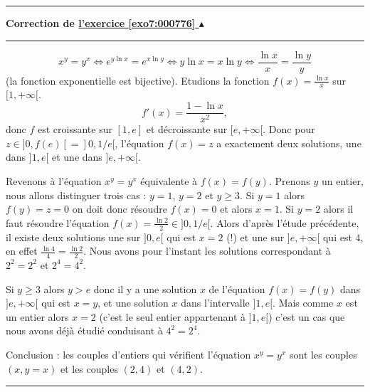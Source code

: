 \documentclass[11pt,a4paper]{article}
\newcounter{exo}
\newcommand{\correction}[1]{\hypertarget{cor7:#1}{}\label{cor7:#1}{\bf Correction de \hyperlink{exo7:#1}{l'exercice \ref{exo7:#1} $\blacktriangle$}}\vspace{1mm}\hrule\vspace{1mm}}
\newcommand{\fincorrection}{\vspace{1mm}\hrule\vspace*{7mm}}
\begin{document}
\fincorrection
\correction{000776}
$$x^y=y^x \Leftrightarrow e^{y\ln x}= e^{x\ln y}
\Leftrightarrow {y\ln x}= {x\ln y}\Leftrightarrow \frac{\ln x}{x}= \frac{\ln y}{y}$$
(la fonction exponentielle est bijective).
Etudions la fonction $f(x) = \frac{\ln x}{x}$ sur $[1,+\infty[$.
$$f'(x)= \frac{1-\ln x}{x^2},$$
donc $f$ est croissante sur $[1,e]$ et d\'ecroissante
sur $[e,+\infty[$. Donc pour $z \in ]0,f(e)[=]0,1/e[$, l'\'equation $f(x)=z$ a exactement deux solutions, une 
dans $]1,e[$ et une dans $]e,+\infty[$.

Revenons \`a l'\'equation $x^y=y^x$ \'equivalente \`a $f(x)=f(y)$.
Prenons $y$ un entier, nous allons distinguer trois cas :
$y=1$, $y=2$ et $y \geq 3$.
Si $y=1$ alors $f(y)=z=0$ on doit
donc r\'esoudre $f(x)=0$ et alors $x=1$.
Si $y=2$ alors il faut r\'esoudre l'\'equation $f(x) = \frac{\ln 2}{2} \in ]0,1/e[$.
Alors d'apr\`es l'\'etude pr\'ec\'edente, il existe deux solutions
une sur $]0,e[$ qui est $x=2$ (!) et une sur $]e,+\infty[$
qui est $4$, en effet $\frac {\ln 4}4= \frac {\ln 2}2$.
Nous avons pour l'instant les solutions correspondant à $2^2=2^2$ et $2^4=4^2$.

Si $y \geq 3$ alors $y> e$ donc il y a une solution $x$ 
de l'\'equation $f(x)=f(y)$ dans $]e,+\infty[$ qui est $x=y$,
et une solution $x$ dans l'intervalle $]1,e[$.
Mais comme $x$ est un entier alors $x=2$ (c'est le seul entier appartenant à $]1,e[$)
c'est un cas que nous avons d\'ej\`a \'etudi\'e conduisant à $4^2 = 2^4$.

Conclusion : les couples d'entiers qui v\'erifient l'\'equation $x^y=y^x$
sont les couples $(x,y=x)$ et les couples $(2,4)$ et $(4,2)$.
\fincorrection
\end{document}
